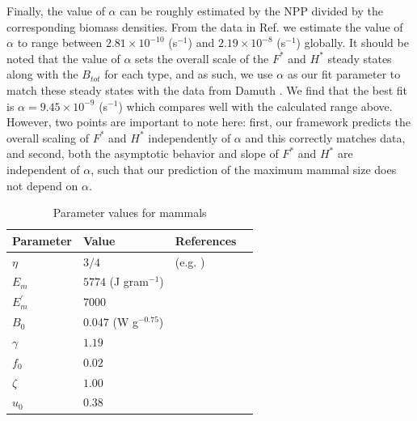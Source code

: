 \documentclass[twocolumn,preprintnumbers,amsmath,amssymb,superscriptaddress]{revtex4}
\begin{document}
\begin{bibunit}[unsrt]
Finally, the value of $\alpha$ can be roughly estimated by the NPP divided by the corresponding biomass densities. From the data in Ref. \cite{michaletz2014convergence} we estimate the value of $\alpha$ to range between $2.81\times10^{-10}$ (s$^{-1}$) and $2.19\times10^{-8}$ (s$^{-1}$) globally. It should be noted that the value of $\alpha$ sets the overall scale of the $F^{*}$ and $H^{*}$ steady states along with the $B_{tot}$ for each type, and as such, we use $\alpha$ as our fit parameter to match these steady states with the data from Damuth \cite{damuth1987interspecific}. We find that the best fit is $\alpha=9.45\times10^{-9}$ (s$^{-1}$) which compares well with the calculated range above. However, two points are important to note here: first, our framework predicts the overall scaling of $F^{*}$ and $H^{*}$ independently of $\alpha$ and this correctly matches data, and second, both the asymptotic behavior and slope of $F^{*}$ and $H^{*}$ are independent of $\alpha$, such that our prediction of the maximum mammal size does not depend on $\alpha$.




 \begin{table}[h]
\caption{Parameter values for mammals}
\label{param}
    \begin{center}
    \small
     \begin{tabular}{ p{1.2cm} p{3.2cm} l p{2.2cm}|}
     \hline
     Parameter & Value & References  \\
     \hline
   $\eta$ & $3/4$  &  (e.g. \cite{West:2001bv,moses2008rmo,hou}) \\
   $E_{m}$ & $5774$ (J gram$^{-1}$)  &  \cite{moses2008rmo,West:2001bv,hou} \\
   $E_{m}^{\prime}$ & $7000$  & \cite{stryer,hou} \\
   $B_{0}$ & $0.047$ (W g$^{-0.75}$)    & \cite{hou}  \\
   $\gamma$ & $1.19$ & \cite{Lindstedt:1985hm} \\
   $f_{0}$ & $0.02$ & \cite{Lindstedt:1985hm}\\
   $\zeta$ & $1.00$  & \cite{Lindstedt:2002td} \\
   $u_{0}$ & $0.38$  & \cite{Lindstedt:2002td} \\


\end{tabular}
\end{center}
\end{table}
\end{bibunit}
\end{document}
